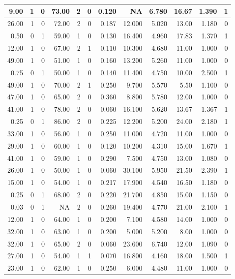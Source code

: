 \documentclass[
]{article}
\begin{document}
\begin{table}
\begin{tabular}[t]{r|r|r|r|r|r|r|r|r|r|r|r}
\hline
9.00 & 1 & 0 & 73.00 & 2 & 0 & 0.120 & NA & 6.780 & 16.67 & 1.390 & 1\\
\hline
26.00 & 1 & 0 & 72.00 & 2 & 0 & 0.187 & 12.000 & 5.020 & 13.00 & 1.180 & 0\\
\hline
0.50 & 0 & 1 & 59.00 & 1 & 0 & 0.130 & 16.400 & 4.960 & 17.83 & 1.370 & 1\\
\hline
12.00 & 1 & 0 & 67.00 & 2 & 1 & 0.110 & 10.300 & 4.680 & 11.00 & 1.000 & 0\\
\hline
49.00 & 1 & 0 & 51.00 & 1 & 0 & 0.160 & 13.200 & 5.260 & 11.00 & 1.000 & 0\\
\hline
0.75 & 0 & 1 & 50.00 & 1 & 0 & 0.140 & 11.400 & 4.750 & 10.00 & 2.500 & 1\\
\hline
49.00 & 1 & 0 & 70.00 & 2 & 1 & 0.250 & 9.700 & 5.570 & 5.50 & 1.100 & 0\\
\hline
47.00 & 1 & 0 & 65.00 & 2 & 0 & 0.360 & 8.800 & 5.780 & 12.00 & 1.000 & 0\\
\hline
41.00 & 1 & 0 & 78.00 & 2 & 0 & 0.060 & 16.100 & 5.620 & 13.67 & 1.367 & 1\\
\hline
0.25 & 0 & 1 & 86.00 & 2 & 0 & 0.225 & 12.200 & 5.200 & 24.00 & 2.180 & 1\\
\hline
33.00 & 1 & 0 & 56.00 & 1 & 0 & 0.250 & 11.000 & 4.720 & 11.00 & 1.000 & 0\\
\hline
29.00 & 1 & 0 & 60.00 & 1 & 0 & 0.120 & 10.200 & 4.310 & 15.00 & 1.670 & 1\\
\hline
41.00 & 1 & 0 & 59.00 & 1 & 0 & 0.290 & 7.500 & 4.750 & 13.00 & 1.080 & 0\\
\hline
26.00 & 1 & 0 & 50.00 & 1 & 0 & 0.060 & 30.100 & 5.950 & 21.50 & 2.390 & 1\\
\hline
15.00 & 1 & 0 & 54.00 & 1 & 0 & 0.217 & 17.900 & 4.540 & 16.50 & 1.180 & 0\\
\hline
0.25 & 0 & 1 & 68.00 & 2 & 0 & 0.220 & 21.700 & 4.850 & 15.00 & 1.150 & 0\\
\hline
0.03 & 0 & 1 & NA & 2 & 0 & 0.260 & 19.400 & 4.770 & 21.00 & 2.100 & 1\\
\hline
12.00 & 1 & 0 & 64.00 & 1 & 0 & 0.200 & 7.100 & 4.580 & 14.00 & 1.000 & 0\\
\hline
32.00 & 1 & 0 & 63.00 & 1 & 0 & 0.200 & 5.000 & 5.200 & 8.00 & 1.000 & 0\\
\hline
32.00 & 1 & 0 & 65.00 & 2 & 0 & 0.060 & 23.600 & 6.740 & 12.00 & 1.090 & 0\\
\hline
27.00 & 1 & 0 & 54.00 & 1 & 1 & 0.070 & 16.800 & 4.160 & 18.00 & 1.500 & 1\\
\hline
23.00 & 1 & 0 & 62.00 & 1 & 0 & 0.250 & 6.000 & 4.480 & 11.00 & 1.000 & 0\\

\end{tabular}
\end{table}
\end{document}
